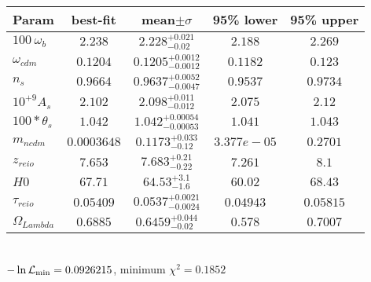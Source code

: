 \begin{tabular}{|l|c|c|c|c|} 
 \hline 
Param & best-fit & mean$\pm\sigma$ & 95\% lower & 95\% upper \\ \hline 
$100~\omega{}_{b }$ &$2.238$ & $2.228_{-0.02}^{+0.021}$ & $2.188$ & $2.269$ \\ 
$\omega{}_{cdm }$ &$0.1204$ & $0.1205_{-0.0012}^{+0.0012}$ & $0.1182$ & $0.123$ \\ 
$n_{s }$ &$0.9664$ & $0.9637_{-0.0047}^{+0.0052}$ & $0.9537$ & $0.9734$ \\ 
$10^{+9}A_{s }$ &$2.102$ & $2.098_{-0.012}^{+0.011}$ & $2.075$ & $2.12$ \\ 
$100*\theta{}_{s }$ &$1.042$ & $1.042_{-0.00053}^{+0.00054}$ & $1.041$ & $1.043$ \\ 
$m_{ncdm }$ &$0.0003648$ & $0.1173_{-0.12}^{+0.033}$ & $3.377e-05$ & $0.2701$ \\ 
$z_{reio }$ &$7.653$ & $7.683_{-0.22}^{+0.21}$ & $7.261$ & $8.1$ \\ 
$H0$ &$67.71$ & $64.53_{-1.6}^{+3.1}$ & $60.02$ & $68.43$ \\ 
$\tau{}_{reio }$ &$0.05409$ & $0.0537_{-0.0024}^{+0.0021}$ & $0.04943$ & $0.05815$ \\ 
$\Omega{}_{Lambda }$ &$0.6885$ & $0.6459_{-0.02}^{+0.044}$ & $0.578$ & $0.7007$ \\ 
\hline 
 \end{tabular} \\ 
$-\ln{\cal L}_\mathrm{min} =0.0926215$, minimum $\chi^2=0.1852$ \\ 
